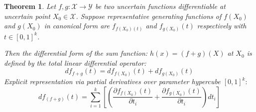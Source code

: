\documentclass[a4paper,12pt, twoside]{memoir}
\newtheorem{theorem}{Theorem}[chapter]
\begin{document}
\begin{theorem}
	Let $f,g : \mathcal{X} \to \mathcal{Y}$ be two uncertain functions differentiable at uncertain point $X_0 \in \mathcal{X}$. Suppose representative generating functions of $f(X_0)$ and $g(X_0)$ in canonical form are $f_{f(X_0)(t)}$ and $f_{g(X_0)}(t)$ respectively with $t \in [0,1]^k$.

	Then the differential form of the sum function:
	$h(x) = (f+g)(X)$ at $X_0$ is defined by the total linear differential operator:
	\[df_{f+g}(t) = df_{f(X_0)}(t) + df_{g(X_0)}(t)\]
	Explicit representation via partial derivatives over parameter hypercube $[0,1]^k:$
	\[df_{\left(f+g\right)}(t) = \sum_{i=1}^{k}\left[ \left(\frac{\partial f_{f(X_0)}(t)}{\partial t_i} + \frac{\partial f_{g(X_0)}(t)}{\partial t_i}\right) dt_i\right]\]
\end{theorem}
\end{document}
